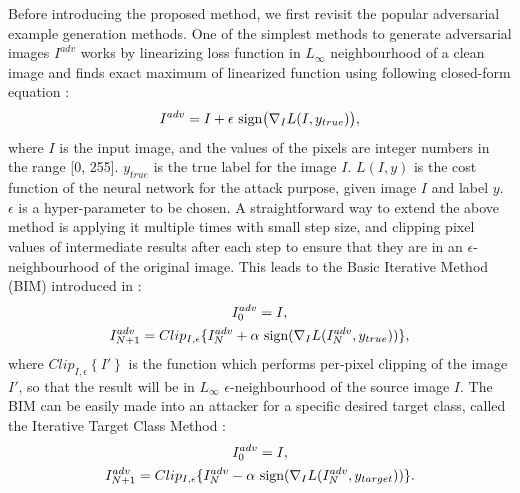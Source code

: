 \documentclass[journal]{IEEEtran}
\begin{document}
Before introducing the proposed method, we first revisit the popular adversarial example generation methods. One of the simplest methods to generate adversarial images $I^{adv}$ works by linearizing loss function in $L_{\infty}$ neighbourhood of a clean image and finds exact maximum of linearized function using following closed-form equation \cite{FGSM}:
\vspace{-0.1cm}
\begin{equation}
    I^{adv} = I + \epsilon \text{ sign} \bigl( \nabla_I L(I, y_{true})  \bigr),
    \vspace{-0.1cm}
\end{equation}
where $I$ is the input image, and the values of the pixels are integer numbers in the range [0, 255]. $y_{true}$ is the true label for the image $I$. $L(I, y)$ is the cost function of the neural network for the attack purpose, given image $I$ and label $y$. $\epsilon$ is a hyper-parameter to be chosen. A straightforward way to extend the above method is applying it multiple times with small step size, and clipping pixel values of intermediate results after each step to ensure that they are in an $\epsilon$-neighbourhood of the original image.  This leads to the Basic Iterative Method (BIM) introduced in \cite{kurakin2017adversarial}: 
\vspace{-0.1cm}
\begin{equation}
    \begin{gathered}
        I_0^{adv} = I, \\
        I_{N+1}^{adv} = Clip_{I,\epsilon}\{I_N^{adv}+\alpha \text{ sign}(\nabla_I L(I_N^{adv},y_{true}))\},
    \end{gathered}
    \vspace{-0.1cm}
\end{equation}
where $Clip_{I, \epsilon} \left\{ I' \right\}$ is the function which performs per-pixel clipping of the image $I'$, so that the result will be in $L_{\infty}$ $\epsilon$-neighbourhood of the source image $I$.
The BIM can be easily made into an attacker for a specific desired target class, called the Iterative Target Class Method \cite{kurakin2017adversarial}:
\vspace{-0.1cm}
\begin{equation}
    \begin{gathered}
        I_0^{adv} = I,\\
        I_{N+1}^{adv} = Clip_{I,\epsilon}\{I_N^{adv}-\alpha \text{ sign}(\nabla_I L(I_N^{adv},y_{target}))\}.
    \end{gathered}
    \vspace{-0.1cm}
    \label{equ:itcm}
\end{equation}
\end{document}
